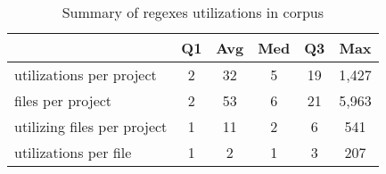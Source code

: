 \begin{table}[tb]
\begin{center}
\begin{small}
\caption{Summary of regexes utilizations  in corpus}
\label{table:saturation}

\begin{tabular}{l|ccccc}
\toprule
 & Q1 & Avg & Med & Q3 & Max \\ 
\midrule
utilizations per project & 2 & 32 & 5 & 19 & 1,427 \\ 
\midrule
files per project & 2 & 53 & 6 & 21 & 5,963 \\ 
\midrule
utilizing files per project & 1 & 11 & 2 & 6 & 541 \\ 
\midrule
utilizations per file & 1 & 2 & 1 & 3 & 207 \\ 
\bottomrule
\end{tabular}
\end{small}
\end{center}

\end{table}
